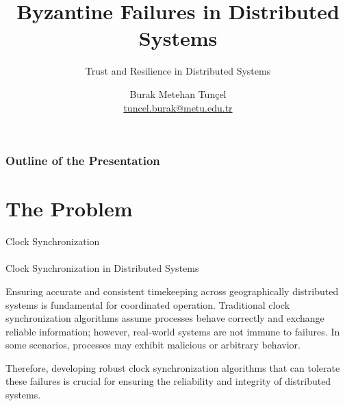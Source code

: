 \documentclass[11pt]{beamer}              %
\author[Burak Metehan Tunçel]{Burak Metehan Tunçel\\\href{mailto:tuncel.burak@metu.edu.tr}{tuncel.burak@metu.edu.tr}}
\title[WINS Beamer Template]{Byzantine Failures in Distributed Systems}
\subtitle[Short SubTitle]{Trust and Resilience in Distributed Systems}
\begin{document}
\begin{frame}[plain]
\titlepage
{}
\end{frame}

\begin{frame}[label=toc]
    \frametitle{Outline of the Presentation}
    \tableofcontents[subsubsectionstyle=hide]
\end{frame}
%
%
\section{The Problem}

\begin{frame}{Clock Synchronization}
\framesubtitle{}
\begin{block}{Clock Synchronization in Distributed Systems} 

Ensuring accurate and consistent timekeeping across geographically distributed systems is fundamental for coordinated operation. Traditional clock synchronization algorithms assume processes behave correctly and exchange reliable information; however, real-world systems are not immune to failures. In some scenarios, processes may exhibit malicious or arbitrary behavior.

Therefore, developing robust clock synchronization algorithms that can tolerate these failures is crucial for ensuring the reliability and integrity of distributed systems.
\end{block}

\note{}
\end{frame}
\end{document}
